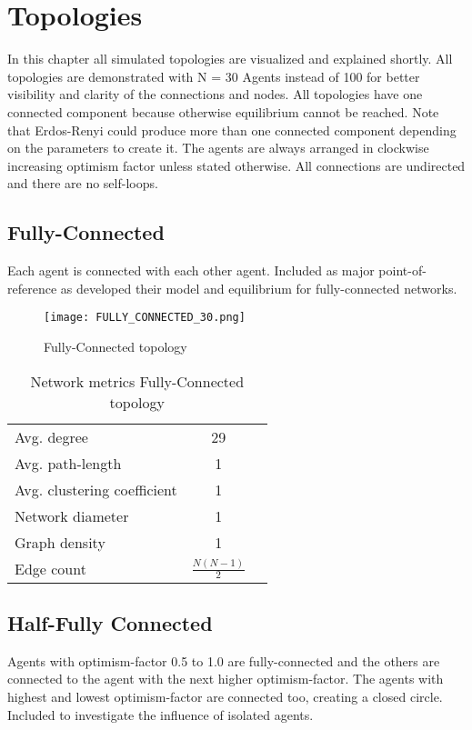 \documentclass[Bachelorarbeit.tex]{subfiles}
\begin{document}
\graphicspath{{./figures/appendixTopologies/}}	%

\chapter{Topologies}
\label{app:topologies}
In this chapter all simulated topologies are visualized and explained shortly. All topologies are demonstrated with N = 30 Agents instead of 100 for better visibility and clarity of the connections and nodes. All topologies have one connected component because otherwise equilibrium cannot be reached. Note that Erdos-Renyi could produce more than one connected component depending on the parameters to create it. The agents are always arranged in clockwise increasing optimism factor unless stated otherwise. All connections are undirected and there are no self-loops.

\section{Fully-Connected}

Each agent is connected with each other agent.
\medskip
Included as major point-of-reference as \cite{Breuer2015} developed their model and equilibrium for fully-connected networks.

\begin{figure}[H]
	\centering
  \texttt{[image: FULLY\_CONNECTED\_30.png]}
	\caption{Fully-Connected topology}
	\label{fig:topology_FULLY_CONNECTED_30}
\end{figure}

\begin{table}[h]
	\centering
	\caption{Network metrics Fully-Connected topology}
	\begin{tabular} { l c r }
		\hline
		Avg. degree & 29 \\
		Avg. path-length & 1 \\
		Avg. clustering coefficient & 1 \\
		Network diameter & 1 \\
		Graph density & 1 \\
		Edge count & $\frac{N(N - 1)}{2}$ \\
		\hline
	\end{tabular}
\end{table}

\section{Half-Fully Connected}
Agents with optimism-factor 0.5 to 1.0 are fully-connected and the others are connected to the agent with the next higher optimism-factor. The agents with highest and lowest optimism-factor are connected too, creating a closed circle.
\medskip
Included to investigate the influence of isolated agents.
\end{document}
